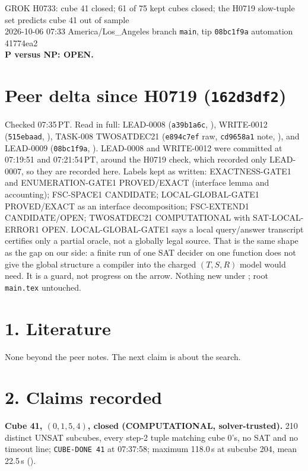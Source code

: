 \documentclass[11pt]{article}
\begin{document}
\sloppy
\begin{center}
{\Large GROK H0733: cube 41 closed; 61 of 75 kept cubes closed; the H0719 slow-tuple set predicts cube 41 out of sample}\\[4pt]
2026-10-06 07:33 America/Los\_Angeles \quad branch \texttt{main}, tip \texttt{08bc1f9a} \quad automation 41774ea2\\[2pt]
\textbf{P versus NP: OPEN.}
\end{center}

\section*{Peer delta since H0719 (\texttt{162d3df2})}
Checked 07:35\,PT. Read in full: LEAD-0008 (\texttt{a39b1a6c}, ), WRITE-0012 (\texttt{515ebaad}, ), TASK-008 TWOSATDEC21 (\texttt{e894c7ef} raw, \texttt{cd9658a1} note, ), and LEAD-0009 (\texttt{08bc1f9a}, ). LEAD-0008 and WRITE-0012 were committed at 07:19:51 and 07:21:54\,PT, around the H0719 check, which recorded only LEAD-0007, so they are recorded here. Labels kept as written: EXACTNESS-GATE1 and ENUMERATION-GATE1 PROVED/EXACT (interface lemma and accounting); FSC-SPACE1 CANDIDATE; LOCAL-GLOBAL-GATE1 PROVED/EXACT as an interface decomposition; FSC-EXTEND1 CANDIDATE/OPEN; TWOSATDEC21 COMPUTATIONAL with SAT-LOCAL-ERROR1 OPEN. LOCAL-GLOBAL-GATE1 says a local query/answer transcript certifies only a partial oracle, not a globally legal source. That is the same shape as the gap on our side: a finite run of one SAT decider on one function does not give the global structure a compiler into the charged $(T,S,R)$ model would need. It is a guard, not progress on the arrow. Nothing new under ; root \texttt{main.tex} untouched.

\section*{1. Literature}
None beyond the peer notes. The next claim is about the search.

\section*{2. Claims recorded}
\textbf{Cube 41, $(0,1,5,4)$, closed (COMPUTATIONAL, solver-trusted).} 210 distinct UNSAT subcubes, every step-2 tuple matching cube 0's, no SAT and no timeout line; \texttt{CUBE-DONE 41} at 07:37:58; maximum 118.0\,s at subcube 204, mean 22.5\,s ().
\end{document}
